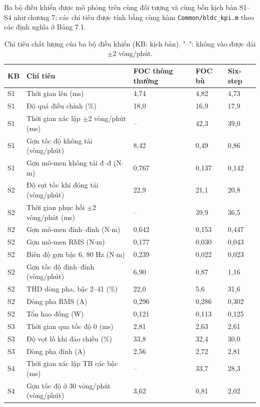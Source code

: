 Ba bộ điều khiển được mô phỏng trên cùng đối tượng và cùng bốn kịch bản S1–S4 như chương 7; các chỉ tiêu được tính bằng cùng hàm \texttt{Common/bldc\_kpi.m} theo các định nghĩa ở Bảng 7.1.

\begin{table}[H]
\centering\small
\caption{Chỉ tiêu chất lượng của ba bộ điều khiển (KB: kịch bản). "–": không vào được dải $\pm$2 vòng/phút.}\label{tab:8.3}
\begin{tabular}{@{}lllll@{}}
\toprule
KB & Chỉ tiêu & FOC thông thường & FOC bù & Six-step \\ \midrule
S1 & Thời gian lên (ms) & 4,74 & 4,82 & 4,73 \\
S1 & Độ quá điều chỉnh (\%) & 18,0 & 16,9 & 17,9 \\
S1 & Thời gian xác lập $\pm$2 vòng/phút (ms) & – & 42,3 & 39,0 \\
S1 & Gợn tốc độ không tải (vòng/phút) & 8,42 & 0,49 & 0,86 \\
S1 & Gợn mô-men không tải đ–đ (N$\cdot$m) & 0,767 & 0,137 & 0,142 \\
S2 & Độ sụt tốc khi đóng tải (vòng/phút) & 22,9 & 21,1 & 20,8 \\
S2 & Thời gian phục hồi $\pm$2 vòng/phút (ms) & – & 39,9 & 36,5 \\
S2 & Gợn mô-men đỉnh–đỉnh (N$\cdot$m) & 0,642 & 0,153 & 0,447 \\
S2 & Gợn mô-men RMS (N$\cdot$m) & 0,177 & 0,030 & 0,043 \\
S2 & Biên độ gợn bậc 6, 80 Hz (N$\cdot$m) & 0,239 & 0,022 & 0,023 \\
S2 & Gợn tốc độ đỉnh–đỉnh (vòng/phút) & 6,90 & 0,87 & 1,16 \\
S2 & THD dòng pha, bậc 2–41 (\%) & 22,0 & 5,6 & 31,6 \\
S2 & Dòng pha RMS (A) & 0,296 & 0,286 & 0,302 \\
S2 & Tổn hao đồng (W) & 0,121 & 0,113 & 0,125 \\
S3 & Thời gian qua tốc độ 0 (ms) & 2,81 & 2,63 & 2,61 \\
S3 & Độ vọt lố khi đảo chiều (\%) & 33,8 & 32,4 & 30,0 \\
S3 & Dòng pha đỉnh (A) & 2,56 & 2,72 & 2,81 \\
S4 & Thời gian xác lập TB các bậc (ms) & – & 33,7 & 28,3 \\
S4 & Gợn tốc độ ở 30 vòng/phút (vòng/phút) & 3,62 & 0,81 & 2,02 \\
\bottomrule
\end{tabular}
\end{table}

